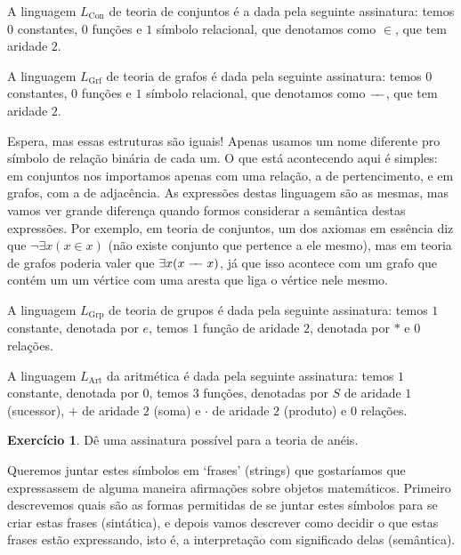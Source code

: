 \documentclass[11pt]{article}
\newcommand{\edge}{%
  \mathrel{-}%
  \joinrel\joinrel %
  \mathrel{-}%
}
\newcommand{\luafacil}{
\emoji{waxing-crescent-moon}
}
\theoremstyle{definition}
\theoremstyle{definition}
\theoremstyle{definition}
\theoremstyle{definition}
\theoremstyle{definition}
\theoremstyle{definition}
\theoremstyle{definition}
\theoremstyle{definition}
\theoremstyle{definition}
\theoremstyle{definition}
\newtheorem*{example*}{Exemplo}
\newenvironment{exemplo*}{
\definecolor{shadecolor}{HTML}{b9e6d3}
\begin{shaded}
\begin{example*}
}
{
\end{example*}
\end{shaded}
}
\theoremstyle{definition}
\theoremstyle{definition}
\theoremstyle{definition}
\newtheorem{exersisio}{Exercício}
\newenvironment{exercicio}{
\definecolor{shadecolor}{HTML}{CFB5FF}
\begin{shaded}
\begin{exersisio}
}
{
\end{exersisio}
\end{shaded}
}
\begin{document}
\begin{exemplo*}
A linguagem $L_{\text{Con}}$ de teoria de conjuntos é a dada pela seguinte assinatura: temos $0$ constantes, $0$ funções e $1$ símbolo relacional, que denotamos como $\in$, que tem aridade $2$.

A linguagem $L_{\text{Grf}}$ de teoria de grafos é dada pela seguinte assinatura: temos $0$ constantes, $0$ funções e $1$ símbolo relacional, que denotamos como $\edge$, que tem aridade $2$.

Espera, mas essas estruturas são iguais! Apenas usamos um nome diferente pro símbolo de relação binária de cada um. O que está acontecendo aqui é simples: em conjuntos nos importamos apenas com uma relação, a de pertencimento, e em grafos, com a de adjacência. As expressões destas linguagem são as mesmas, mas vamos ver grande diferença quando formos considerar a semântica destas expressões. Por exemplo, em teoria de conjuntos, um dos axiomas em essência diz que $\lnot \exists x (x \in x)$ (não existe conjunto que pertence a ele mesmo), mas em teoria de grafos poderia valer que $\exists x (x \edge x)$, já que isso acontece com um grafo que contém um um vértice com uma aresta que liga o vértice nele mesmo.

A linguagem $L_{\text{Grp}}$ de teoria de grupos é dada pela seguinte assinatura: temos $1$ constante, denotada por $e$, temos $1$ função de aridade $2$, denotada por $*$ e $0$ relações.

A linguagem $L_{\text{Art}}$ da aritmética é dada pela seguinte assinatura: temos $1$ constante, denotada por $0$, temos $3$ funções, denotadas por $S$ de aridade $1$ (sucessor), $+$ de aridade $2$ (soma) e $\cdot$ de aridade $2$ (produto) e $0$ relações.

\end{exemplo*}

\begin{exercicio}
  \luafacil Dê uma assinatura possível para a teoria de anéis.
\end{exercicio}

Queremos juntar estes símbolos em `frases' (strings) que gostaríamos que expressassem de alguma maneira afirmações sobre objetos matemáticos. Primeiro descrevemos quais são as formas permitidas de se juntar estes símbolos para se criar estas frases (sintática), e depois vamos descrever como decidir o que estas frases estão expressando, isto é, a interpretação com significado delas (semântica). 
\end{document}
